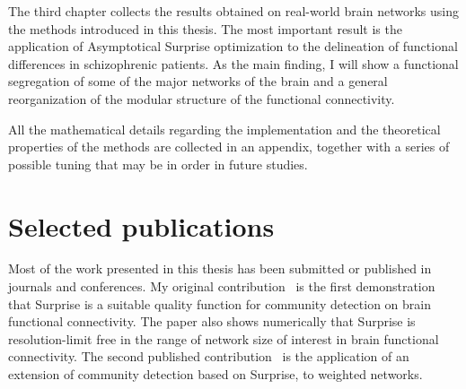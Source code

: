 The third chapter collects the results obtained on real-world brain networks using the methods introduced in this thesis. The most important result is the application of Asymptotical Surprise optimization to the delineation of functional differences in schizophrenic patients. As the main finding, I will show a functional segregation of some of the major networks of the brain and a general reorganization of the modular structure of the functional connectivity.

All the mathematical details regarding the implementation and the theoretical properties of the methods are collected in an appendix, together with a series of possible tuning that may be in order in future studies.

\section*{Selected publications}
Most of the work presented in this thesis has been submitted or published in journals and conferences. My original contribution~\cite{nicolini2016} is the first demonstration that Surprise is a suitable quality function for community detection on brain functional connectivity.
The paper also shows numerically that Surprise is resolution-limit free in the range of network size of interest in brain functional connectivity.
The second published contribution~\cite{nicolini2017} is the application of an extension of community detection based on Surprise, to weighted networks.